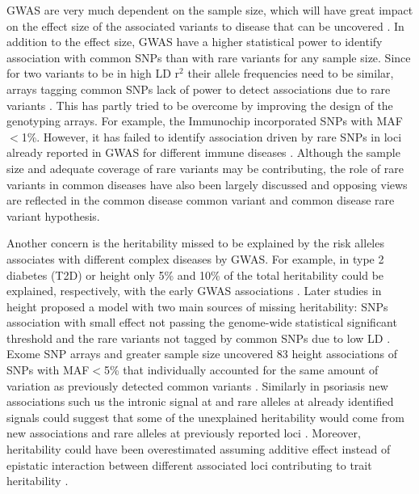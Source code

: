 GWAS are very much dependent on the sample size, which will have great impact on the effect size of the associated variants to disease that can be uncovered \parencite{Visscher2017}. In addition to the effect size, GWAS have a higher statistical power to identify association with common SNPs than with rare variants for any sample size. Since for two variants to be in high LD r$^2$ their allele frequencies need to be similar, arrays tagging common SNPs lack of power to detect associations due to rare variants \parencite{Wray2005}. This has partly tried to be overcome by improving the design of the genotyping arrays. For example, the Immunochip incorporated SNPs with MAF${<}$1\%. However, it has failed to identify association driven by rare SNPs in loci already reported in GWAS for different immune diseases \parencite{Visscher2017}. Although the sample size and adequate coverage of rare variants may be contributing, the role of rare variants in common diseases have also been largely discussed and opposing views are reflected in the common disease common variant and common disease rare variant hypothesis. 

Another concern is the heritability missed to be explained by the risk alleles associates with different complex diseases by GWAS. For example, in type 2 diabetes (T2D) or height only 5\% and 10\% of the total heritability could be explained, respectively, with the early GWAS associations \parencite{Ku2010, Yang2010}. Later studies in height proposed a model with two main sources of missing heritability: SNPs association with small effect not passing the genome-wide statistical significant threshold and the rare variants not tagged by common SNPs due to low LD \parencite{Yang2010}. Exome SNP arrays and greater sample size uncovered 83 height associations of SNPs with MAF${<}$5\% that individually accounted for the same amount of variation as previously detected common variants \parencite{Marouli2017}. Similarly in psoriasis new associations such us the intronic signal at \parencite{TNFSF15} and rare alleles at already identified signals could suggest that  some of the unexplained heritability would come from new associations and rare alleles at previously reported loci \parencite{Dand2017.}. Moreover, heritability could have been overestimated assuming additive effect instead of epistatic interaction between different associated loci contributing to trait heritability \parencite{Zuk2012}.

